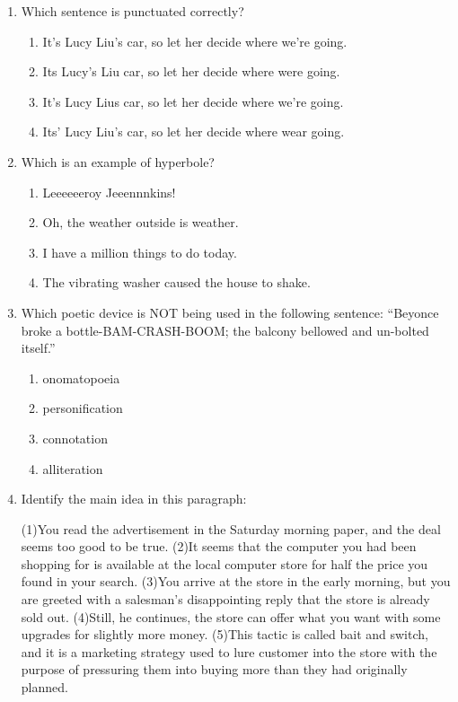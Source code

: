 \documentclass[11pt]{exam}
\begin{document}
\begin{questions}
\begin{enumerate}



\item Which sentence is punctuated correctly?

\begin{enumerate}
\item It's Lucy Liu's car, so let her decide where we're going.
\item Its Lucy's Liu car, so let her decide where were going.
\item It's Lucy Lius car, so let her decide where we're going.
\item Its' Lucy Liu's car, so let her decide where wear going.
\end{enumerate}

\item Which is an example of hyperbole?
\begin{enumerate}
\item Leeeeeeroy Jeeennnkins!
\item Oh, the weather outside is weather.
\item I have a million things to do today.
\item The vibrating washer caused the house to shake.
\end{enumerate}

\item Which poetic device is NOT being used in the following sentence:
  “Beyonce broke a bottle-BAM-CRASH-BOOM; the balcony bellowed and un-bolted itself.”
\begin{enumerate}
\item onomatopoeia
\item personification
\item connotation
\item alliteration
\end{enumerate}

\item Identify the main idea in this paragraph:

(1)You read the advertisement in the Saturday morning paper, and the deal seems too good to be true. (2)It seems that the computer you had been shopping for is available at the local computer store for half the price you found in your search. (3)You arrive at the store in the early morning, but you are greeted with a salesman's disappointing reply that the store is already sold out. (4)Still, he continues, the store can offer what you want with some upgrades for slightly more money. (5)This tactic is called bait and switch, and it is a marketing strategy used to lure customer into the store with the purpose of pressuring them into buying more than they had originally planned.


\end{enumerate}
\end{questions}
\end{document}
